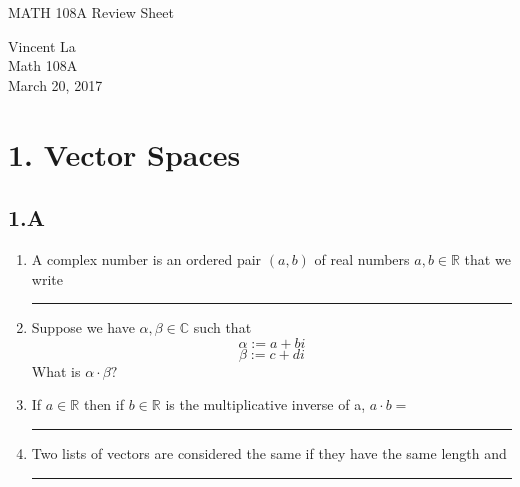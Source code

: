 \documentclass[11pt]{article}
\title{ }
\begin{document}
	\begin{center}	%
		\Large{MATH 108A Review Sheet}	%
	\end{center}
	\begin{center}
		Vincent La \\
		Math 108A \\
		March 20, 2017
	\end{center}

\section*{1. Vector Spaces}
\subsection*{1.A}
\begin{enumerate}
	\item A complex number is an ordered pair $(a, b)$ of real numbers $a, b \in \mathbb{R}$ that we write \rule[0ex]{1in}{0.5pt}
	\item Suppose we have $\alpha, \beta \in \mathbb{C}$ such that
	\[\alpha := a + bi \]
	\[\beta := c + di \]
	What is $\alpha \cdot \beta?$
	\item If $a \in \mathbb{R}$ then if $b \in \mathbb{R}$ is the multiplicative inverse of a, $a \cdot b = $ \rule[0ex]{1in}{0.5pt}
	\item Two lists of vectors are considered the same if they have the same length and \rule[0ex]{1in}{0.5pt}
\end{enumerate} 
\end{document}
